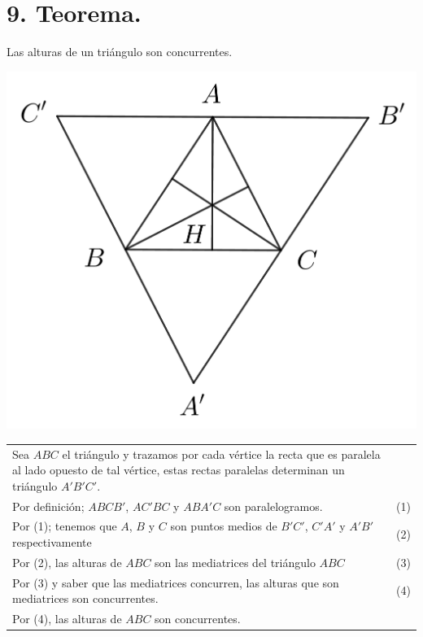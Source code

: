 \documentclass[12pt,a4paper, oneside]{book}
\begin{document}
\section{9. Teorema.}
Las alturas de un triángulo son concurrentes.
\\
\begin{center}
\includegraphics[scale=0.6]{Imagenes/alturas.png} 
\end{center}
\begin{tabular}{p{15.9cm}p{1cm}}
Sea $ABC$ el triángulo y trazamos por cada vértice la recta que es paralela al lado opuesto de tal vértice, estas rectas paralelas determinan un triángulo $A'B'C'$.
\\Por definición; $ABCB'$, $AC'BC$ y $ABA'C$ son paralelogramos. &(1) 
\\Por (1); tenemos que $A$, $B$ y $C$ son puntos medios de $B'C'$,  $C'A'$ y $A'B'$ respectivamente& (2)
\\Por (2), las alturas de $ABC$ son las mediatrices del triángulo $ABC$ &(3)
\\Por (3) y saber que las mediatrices concurren, las alturas que son mediatrices son concurrentes. &\medskip(4)
\\Por (4), las alturas de $ABC$ son concurrentes.
\end{tabular}
\end{document}

